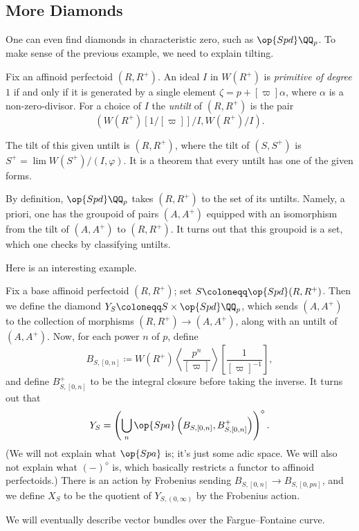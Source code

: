 \documentclass[../notes.tex]{subfiles}
\begin{document}
\subsection{More Diamonds}
One can even find diamonds in characteristic zero, such as $\op{Spd}\QQ_p$. To make sense of the previous example, we need to explain tilting.
\begin{definition}[untilt]
	Fix an affinoid perfectoid $(R,R^+)$. An ideal $I$ in $W(R^+)$ is \textit{primitive of degree $1$} if and only if it is generated by a single element $\zeta=p+[\varpi]\alpha$, where $\alpha$ is a non-zero-divisor. For a choice of $I$ the \textit{untilt} of $(R,R^+)$ is the pair
	\[\left(W(R^+)[1/[\varpi]]/I,W(R^+)/I\right).\]
\end{definition}
\begin{remark}
	The tilt of this given untilt is $(R,R^+)$, where the tilt of $(S,S^+)$ is $S^+=\lim W(S^+)/(I,\varphi)$. It is a theorem that every untilt has one of the given forms.
\end{remark}
\begin{example}
	By definition, $\op{Spd}\QQ_p$ takes $(R,R^+)$ to the set of its untilts. Namely, a priori, one has the groupoid of pairs $(A,A^+)$ equipped with an isomorphism from the tilt of $(A,A^+)$ to $(R,R^+)$. It turns out that this groupoid is a set, which one checks by classifying untilts.
\end{example}
Here is an interesting example.
\begin{example}
	Fix a base affinoid perfectoid $(R,R^+)$; set $S\coloneqq\op{Spd}(R,R^+)$. Then we define the diamond $Y_S\coloneqq S\times\op{Spd}\QQ_p$, which sends $(A,A^+)$ to the collection of morphisms $(R,R^+)\to(A,A^+)$, along with an untilt of $(A,A^+)$. Now, for each power $n$ of $p$, define
	\[B_{S,[0,n]}\coloneqq W(R^+)\left\langle\frac{p^n}{[\varpi]}\right\rangle\left[\frac1{[\varpi]^{-1}}\right],\]
	and define $B_{S,[0,n]}^+$ to be the integral closure before taking the inverse. It turns out that
	\[Y_S=\left(\bigcup_n\op{Spa}\left(B_{S,[0,n]},B_{S,[0,n]}^+\right)\right)^\diamond.\]
	(We will not explain what $\op{Spa}$ is; it's just some adic space. We will also not explain what $(-)^\diamond$ is, which basically restricts a functor to affinoid perfectoids.) There is an action by Frobenius sending $B_{S,[0,n]}\to B_{S,[0,pn]}$, and we define $X_S$ to be the quotient of $Y_{S,(0,\infty)}$ by the Frobenius action.
\end{example}
We will eventually describe vector bundles over the Fargue--Fontaine curve.
\end{document}
